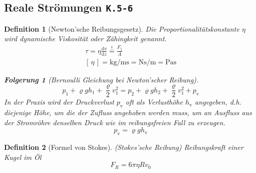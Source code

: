 \documentclass[a4paper, twocolumn]{article}
\numberwithin{equation}{section}
\theoremstyle{hsr-def}
\newtheorem{definition}{Definition}[section]
\theoremstyle{hsr-sub}
\newtheorem{result}{Folgerung}[definition]
\newcommand{\dd}[1]{\ensuremath{\mathrm{d}#1}}
\newcommand{\deriv}[2]{\ensuremath{\frac{\dd{#1}}{\dd{#2}}}}
\newcommand{\unitof}[1]{\ensuremath{\left[\,#1\,\right]}}
\newcommand{\fromlecture}[1]{\textcolor{red!70!black}{\small\texttt{K.#1}}}
\begin{document}
\subsection{Reale Str\"omungen \fromlecture{5-6}}

\begin{definition}[Newton'sche Reibungsgesetz]
Die Proportionalit\"atskonstante \(\eta\) wird \emph{dynamische Viskosit\"at} oder \emph{Z\"ahingkeit} genannt.
\begin{gather*}
    \tau = \eta \deriv{v}{z}
    \stackrel{!}{=} \frac{F_\parallel}{A}  \\
    \unitof{\eta}  
    = \si{\kilo\gram\per\metre\second}
    = \si{\newton\second\per\metre}
    = \si{\pascal\second}
\end{gather*}

\begin{result}[Bernoulli Gleichung bei Newton'scher Reibung]
\[
    p_1 + \varrho g h_1 + \frac{\varrho}{2} v_1^2
    =
    p_2 + \varrho g h_2 + \frac{\varrho}{2} v_1^2 + p_\text{v}
\]
In der Praxis wird der Druckverlust \(p_\text{v}\) oft als Verlusth\"ohe \(h_\text{v}\) angegeben, d.h. diejenige H\"ohe, um die der Zufluss angehoben werden muss, um an Ausfluss aus der Stromr\"ohre denselben Druck wie im reibungsfreien Fall zu erzeugen.
\[
    p_\text{v} = \varrho g h_\text{v}  
\]
\end{result}
\end{definition}

\begin{definition}[Formel von Stokes]
(Stokes'sche Reibung) Reibungskraft einer Kugel im \"Ol 
\[
    F_R = 6\pi\eta Rv_0
\]
\end{definition}
\end{document}
